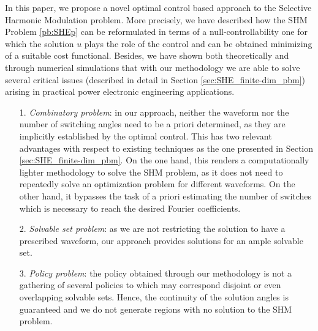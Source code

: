 \documentclass[twocolumn]{autart}    %
\begin{document}
In this paper, we propose a novel optimal control based approach to the Selective Harmonic Modulation problem. More precisely, we have described how the SHM Problem \ref{pb:SHEp} can be reformulated in terms of a null-controllability one for which the solution $u$ plays the role of the control and can be obtained minimizing of a suitable cost functional. Besides, we have shown both theoretically and through numerical simulations that with our methodology we are able to solve several critical issues (described in detail in Section \ref{sec:SHE_finite-dim_pbm}) arising in practical power electronic engineering applications.
\begin{itemize}
	\item[1.]  \textit{Combinatory problem}: in our approach, neither the waveform nor the number of switching angles need to be a priori determined, as they are implicitly established by the optimal control. This has two relevant advantages with respect to existing techniques as the one presented in Section \ref{sec:SHE_finite-dim_pbm}. On the one hand, this renders a computationally lighter methodology to solve the SHM problem, as it does not need to repeatedly solve an optimization problem for different waveforms. On the other hand, it bypasses the task of a priori estimating the number of switches which is necessary to reach the desired Fourier coefficients.
	
	\item[2.] \textit{Solvable set problem}: as we are not restricting the solution to have a prescribed waveform,  our approach provides solutions for an ample solvable set. 
	
	\item[3.] \textit{Policy problem}: the policy obtained through our methodology is not a gathering of several policies to which may correspond disjoint or even overlapping solvable sets. Hence, the continuity of the solution angles is guaranteed and we do not generate regions with no solution to the SHM problem.
\end{itemize}
\end{document}
